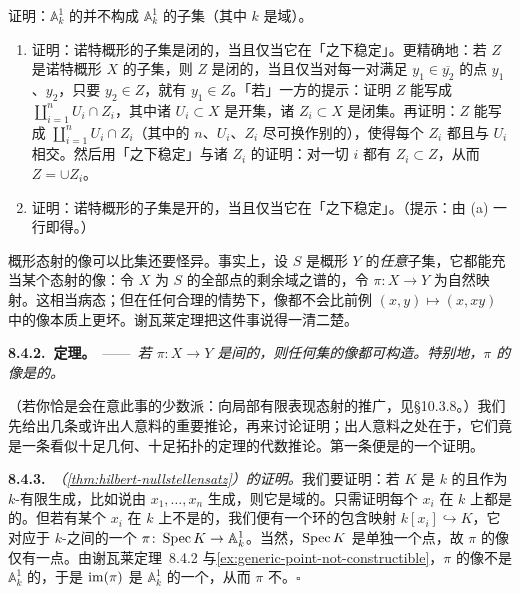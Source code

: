 \begin{exercise}[容易的练习（用于\S8.4.3）]\label{ex:generic-point-not-constructible}
证明：$\mathbb{A}^1_k$ 的\trGenericPoint{}并不构成 $\mathbb{A}^1_k$ 的\trConstructible{}子集（其中 $k$ 是域）。
\end{exercise}

\begin{exercise}[练习（用于\mbox{练习~24.5.G}）]\label{ex:constructible-stable-specialization}
\begin{enumerate}[label=(\alph*)]
\item 证明：诺特概形的\trConstructible{}子集是闭的，当且仅当它在「\trSpecialization{}之下稳定」。更精确地：若 $Z$ 是诺特概形 $X$ 的\trConstructible{}子集，则 $Z$ 是闭的，当且仅当对每一对满足 $y_1\in\overline{y_2}$ 的点 $y_1$、$y_2$，只要 $y_2\in Z$，就有 $y_1\in Z$。「若」一方的提示：证明 $Z$ 能写成 $\coprod_{i=1}^{n}U_i\cap Z_i$，其中诸 $U_i\subset X$ 是开集，诸 $Z_i\subset X$ 是闭集。再证明：$Z$ 能写成 $\coprod_{i=1}^{n}U_i\cap Z_i$（其中的 $n$、$U_i$、$Z_i$ 尽可换作别的），使得每个 $Z_i$ 都\trIrreducible{}且与 $U_i$ 相交。然后用「\trSpecialization{}之下稳定」与诸 $Z_i$ 的\trGenericPoint{}证明：对一切 $i$ 都有 $Z_i\subset Z$，从而 $Z=\cup Z_i$。
\item 证明：诺特概形的\trConstructible{}子集是开的，当且仅当它在「\trGenerization{}之下稳定」。（提示：由 (a) 一行即得。）
\end{enumerate}
\end{exercise}

概形态射的像可以比\trConstructible{}集还要怪异。事实上，设 $S$ 是概形 $Y$ 的\emph{任意}子集，它都能充当某个态射的像：令 $X$ 为 $S$ 的全部点的剩余域之谱的\trDisjointUnion，令 $\pi\colon X\to Y$ 为自然映射。这相当病态；但在任何合理的情势下，像都不会比前例 $(x,y)\mapsto(x,xy)$ 中的像本质上更坏。谢瓦莱定理把这件事说得一清二楚。

\textbf{8.4.2.\ \trChevalley{}定理。}\ ——\ \emph{若 $\pi\colon X\to Y$ 是\trNoetherian\trScheme{}间的\trFiniteType\trMorphism，则任何\trConstructible{}集的像都可构造。特别地，$\pi$ 的像是\trConstructible{}的。}

（若你恰是会在意此事的少数派：向局部有限表现态射的推广，见\S10.3.8。）我们先给出几条或许出人意料的重要推论，再来讨论证明；出人意料之处在于，它们竟是一条看似十足几何、十足拓扑的定理的代数推论。第一条便是\trNullstellensatz{}的一个证明。

\textbf{8.4.3.}\ \emph{\trNullstellensatz（\cref{thm:hilbert-nullstellensatz}）的证明。}\quad 我们要证明：若 $K$ 是 $k$ 的\trFieldExtension{}且作为 $k$-\trAlgebra{}有限生成，比如说由 $x_1,\dots,x_n$ 生成，则它是域的\trFiniteFieldExtension。只需证明每个 $x_i$ 在 $k$ 上都是\trAlgebraic{}的。但若有某个 $x_i$ 在 $k$ 上不是\trAlgebraic{}的，我们便有一个环的包含映射 $k[x_i]\hookrightarrow K$，它对应于\trFiniteType{} $k$-\trScheme{}之间的一个\trDominant\trMorphism{} $\pi\colon\operatorname{Spec} K\to\mathbb{A}^1_k$。当然，$\operatorname{Spec} K$ 是单独一个点，故 $\pi$ 的像仅有一点。由谢瓦莱定理~8.4.2 与\cref{ex:generic-point-not-constructible}，$\pi$ 的像不是 $\mathbb{A}^1_k$ 的\trGenericPoint，于是 $\operatorname{im}(\pi)$ 是 $\mathbb{A}^1_k$ 的一个\trClosedPoint，从而 $\pi$ 不\trDominant。\hfill$\square$

